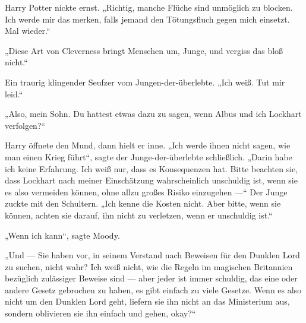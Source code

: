 Harry Potter nickte ernst.
„Richtig, manche Flüche sind unmöglich zu blocken. Ich werde mir das merken, falls jemand den Tötungsfluch gegen mich einsetzt. Mal wieder.“

„Diese Art von Cleverness bringt Menschen um, Junge, und vergiss das bloß nicht.“

Ein traurig klingender Seufzer vom Jungen-der-überlebte.
„Ich weiß. Tut mir leid.“

„Also, mein Sohn. Du hattest etwas dazu zu sagen, wenn Albus und ich Lockhart verfolgen?“

Harry öffnete den Mund, dann hielt er inne.
„Ich werde ihnen nicht sagen, wie man einen Krieg führt“, sagte der Junge-der-überlebte schließlich.
„Darin habe ich keine Erfahrung. Ich weiß nur, dass es Konsequenzen hat. Bitte beachten sie, dass Lockhart nach meiner Einschätzung wahrscheinlich unschuldig ist, wenn sie es also vermeiden können, ohne allzu großes Risiko einzugehen —“ Der Junge zuckte mit den Schultern.
„Ich kenne die Kosten nicht. Aber bitte, wenn sie können, achten sie darauf, ihn nicht zu verletzen, wenn er unschuldig ist.“

„Wenn ich kann“, sagte Moody.

„Und — Sie haben vor, in seinem Verstand nach Beweisen für den Dunklen Lord zu suchen, nicht wahr? Ich weiß nicht, wie die Regeln im magischen Britannien bezüglich zulässiger Beweise sind — aber jeder ist immer schuldig, das eine oder andere Gesetz gebrochen zu haben, es gibt einfach zu viele Gesetze. Wenn es also nicht um den Dunklen Lord geht, liefern sie ihn nicht an das Ministerium aus, sondern oblivieren sie ihn einfach und gehen, okay?“

